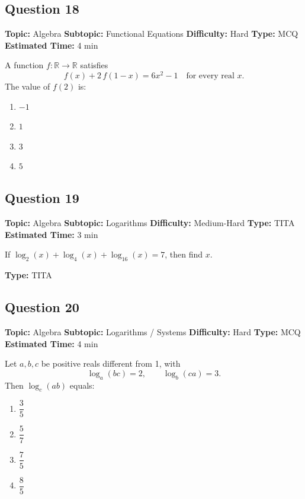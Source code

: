 \documentclass[11pt]{article}
\begin{document}
\subsection*{Question 18}
\textbf{Topic:} Algebra \quad \textbf{Subtopic:} Functional Equations \quad \textbf{Difficulty:} Hard \quad \textbf{Type:} MCQ \quad \textbf{Estimated Time:} 4 min

\begin{tcolorbox}
A function $f:\mathbb{R}\to\mathbb{R}$ satisfies
\[ f(x) + 2\,f(1-x) = 6x^{2} - 1 \quad \text{for every real } x. \]
The value of $f(2)$ is:
\end{tcolorbox}
\begin{enumerate}[label=(\Alph*)]
\item $-1$
\item $1$
\item $3$
\item $5$
\end{enumerate}

\subsection*{Question 19}
\textbf{Topic:} Algebra \quad \textbf{Subtopic:} Logarithms \quad \textbf{Difficulty:} Medium-Hard \quad \textbf{Type:} TITA \quad \textbf{Estimated Time:} 3 min

\begin{tcolorbox}
If $\log_{2}(x) + \log_{4}(x) + \log_{16}(x) = 7$, then find $x$.
\end{tcolorbox}
\textbf{Type:} TITA

\subsection*{Question 20}
\textbf{Topic:} Algebra \quad \textbf{Subtopic:} Logarithms / Systems \quad \textbf{Difficulty:} Hard \quad \textbf{Type:} MCQ \quad \textbf{Estimated Time:} 4 min

\begin{tcolorbox}
Let $a, b, c$ be positive reals different from 1, with
\[ \log_{a}(bc) = 2, \qquad \log_{b}(ca) = 3. \]
Then $\log_{c}(ab)$ equals:
\end{tcolorbox}
\begin{enumerate}[label=(\Alph*)]
\item $\dfrac{3}{5}$
\item $\dfrac{5}{7}$
\item $\dfrac{7}{5}$
\item $\dfrac{8}{5}$
\end{enumerate}
\end{document}
